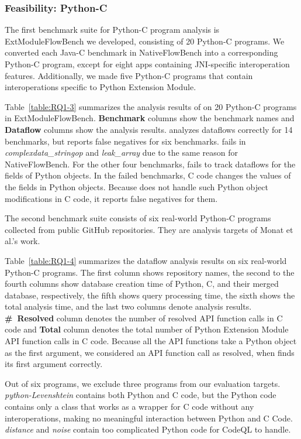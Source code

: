 \subsubsection{Feasibility: Python-C}


The first benchmark suite for Python-C program analysis is ExtModuleFlowBench we developed,
consisting of 20 Python-C programs.
We converted each Java-C benchmark in NativeFlowBench into a
corresponding Python-C program, except for eight apps containing JNI-specific interoperation
features. Additionally, we made five Python-C programs that contain interoperations
specific to Python Extension Module.

Table~\ref{table:RQ1-3} summarizes the analysis results of \ours
on 20 Python-C programs in ExtModuleFlowBench.
{\bf Benchmark} columns show the benchmark names and {\bf Dataflow}
columns show the analysis results.
\ours analyzes dataflows correctly for 14 benchmarks, but reports false
negatives for six benchmarks.
\ours fails in {\it complexdata\_stringop} and {\it leak\_array} due to the
same reason for NativeFlowBench.
For the other four benchmarks, \ours fails to track dataflows for the fields of Python objects. 
In the failed benchmarks, C code changes the values of the fields in Python objects.
Because \ours does not handle such Python object modifications in C code, it
reports false negatives for them.



The second benchmark suite consists of six real-world Python-C programs
collected from public GitHub repositories. They are analysis targets of
Monat et al.\cite{sas2021}'s work.

Table~\ref{table:RQ1-4} summarizes the dataflow analysis results on six
real-world Python-C programs. 
The first column shows repository names, the second to the fourth columns show
database creation time of Python, C, and their merged database, respectively,
the fifth shows query processing time, the sixth shows the total analysis time,
and the last two columns denote analysis results.
{\bf \#~Resolved} column denotes the number of resolved API function calls in C code and
{\bf Total} column denotes the total number of Python Extension Module API function
calls in C code. 
Because all the API functions take a Python object as the first argument, we
considered an API function call as resolved, when \ours finds its first argument
correctly. 


Out of six programs, we exclude three programs from our evaluation targets.
{\it python-Levenshtein} contains both Python and C code, but the Python code
contains only a class that works as a wrapper for C code without any interoperations,
making no meaningful interaction between Python and C Code.
{\it distance} and {\it noise} contain too complicated Python code for CodeQL
to handle.

